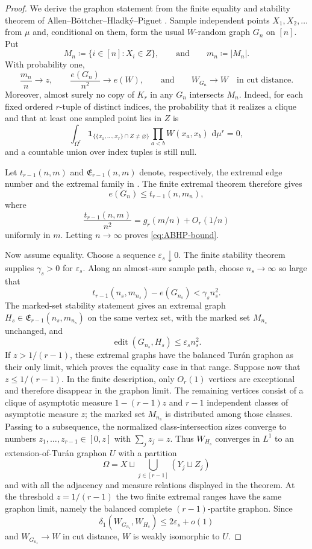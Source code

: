 \documentclass[10pt]{article}
\numberwithin{equation}{section}
\newcommand{\edit}{\operatorname{edit}}
\newcommand{\one}{\mathbf 1}
\newcommand{\eps}{\varepsilon}
\newcommand{\dd}{\,\mathrm d}
\newcommand{\distone}{\delta_1}
\begin{document}
\begin{proof}
We derive the graphon statement from the finite equality and stability theorem of Allen--B\"ottcher--Hladk\'y--Piguet \cite{ABHP14}.  Sample independent points $X_1,X_2,\ldots$ from $\mu$ and, conditional on them, form the usual $W$-random graph $G_n$ on $[n]$.  Put
\[
 M_n\coloneqq\{i\in[n]\colon X_i\in Z\},
 \qquad\text{and}\qquad m_n\coloneqq|M_n|.
\]
With probability one,
\[
 \frac{m_n}{n}\longrightarrow z,
 \qquad
 \frac{e(G_n)}{n^2}\longrightarrow e(W),
 \qquad\text{and}\qquad
 W_{G_n}\longrightarrow W
 \quad\text{in cut distance}.
\]
Moreover, almost surely no copy of $K_r$ in any $G_n$ intersects $M_n$.  Indeed, for each fixed ordered $r$-tuple of distinct indices, the probability that it realizes a clique and that at least one sampled point lies in $Z$ is
\[
 \int_{\Omega^r}
 \one_{\{\{x_1,\ldots,x_r\}\cap Z\ne\varnothing\}}
 \prod_{a<b}W(x_a,x_b)\,\dd\mu^r=0,
\]
and a countable union over index tuples is still null.

Let $t_{r-1}(n,m)$ and $\mathfrak E_{r-1}(n,m)$ denote, respectively, the extremal edge number and the extremal family in \cite[Theorem~2]{ABHP14}.  The finite extremal theorem therefore gives
\[
 e(G_n)\le t_{r-1}(n,m_n),
\]
where
\[
 \frac{t_{r-1}(n,m)}{n^2}
 =g_r(m/n)+O_r(1/n)
\]
uniformly in $m$.  Letting $n\to\infty$ proves \cref{eq:ABHP-bound}.

Now assume equality.  Choose a sequence $\eps_s\downarrow0$.  The finite stability theorem supplies $\gamma_s>0$ for $\eps_s$.  Along an almost-sure sample path, choose $n_s\to\infty$ so large that
\[
 t_{r-1}(n_s,m_{n_s})-e(G_{n_s})<\gamma_s n_s^2.
\]
The marked-set stability statement \cite[Theorem~2(c)]{ABHP14} gives an extremal graph $H_s\in\mathfrak E_{r-1}(n_s,m_{n_s})$ on the same vertex set, with the marked set $M_{n_s}$ unchanged, and
\[
 \edit(G_{n_s},H_s)\le\eps_s n_s^2.
\]
If $z>1/(r-1)$, these extremal graphs have the balanced Tur\'an graphon as their only limit, which proves the equality case in that range.  Suppose now that $z\le1/(r-1)$.  In the finite description, only $O_r(1)$ vertices are exceptional and therefore disappear in the graphon limit.  The remaining vertices consist of a clique of asymptotic measure $1-(r-1)z$ and $r-1$ independent classes of asymptotic measure $z$; the marked set $M_{n_s}$ is distributed among those classes.  Passing to a subsequence, the normalized class-intersection sizes converge to numbers $z_1,\ldots,z_{r-1}\in[0,z]$ with $\sum_jz_j=z$.  Thus $W_{H_s}$ converges in $L^1$ to an extension-of-Tur\'an graphon $U$ with a partition
\[
 \Omega=X\sqcup\bigcup_{j\in[r-1]}(Y_j\sqcup Z_j)
\]
and with all the adjacency and measure relations displayed in the theorem.  At the threshold $z=1/(r-1)$ the two finite extremal ranges have the same graphon limit, namely the balanced complete $(r-1)$-partite graphon.  Since
\[
 \distone(W_{G_{n_s}},W_{H_s})\le2\eps_s+o(1)
\]
and $W_{G_{n_s}}\to W$ in cut distance, $W$ is weakly isomorphic to $U$.


\end{proof}
\end{document}
